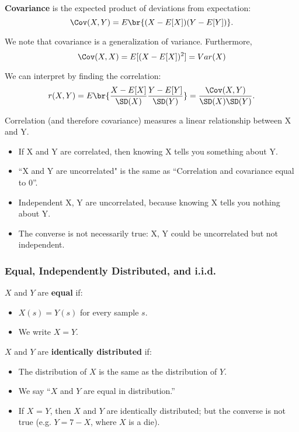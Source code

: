 \documentclass[openany]{book}
\begin{document}
\begin{defn}[Covariance]
	\textbf{Covariance} is the expected product of deviations from expectation:
	\begin{equation*}
		\Cov(X,Y) = E\br{(X- E[X]) (Y-E[Y])}.
	\end{equation*}
\end{defn}

\begin{rmk}
	We note that covariance is a generalization of variance. Furthermore, 
	\begin{equation*}
		\Cov(X,X) = E[(X - E[X])^{2}] = Var(X)
	\end{equation*}
\end{rmk}

We can interpret by finding the correlation:
\begin{equation*}
	r(X,Y) = E \br{\dfrac{X - E[X]}{\SD(X)} \dfrac{Y-E[Y]}{\SD(Y)}} = \dfrac{\Cov(X,Y)}{\SD(X)\SD(Y)}. 
\end{equation*}

Correlation (and therefore covariance) measures a linear relationship between X and Y.
\begin{itemize}
	\item If X and Y are correlated, then knowing X tells you something about Y.
	\item ``X and Y are uncorrelated" is the same as “Correlation and covariance equal to 0”.
	\item Independent X, Y are uncorrelated, because knowing X tells you nothing about Y.
	\item The converse is not necessarily true: X, Y could be uncorrelated but not independent.
\end{itemize}

\subsubsection{Equal, Independently Distributed, and i.i.d.}
\begin{defn}[Equal]
	$X$ and $Y$ are \textbf{equal} if:
	\begin{itemize}
		\item $X(s) = Y(s)$ for every sample $s$.
		\item We write $X = Y$.
	\end{itemize}
\end{defn}

\begin{defn}
	$X$ and $Y$ are \textbf{identically distributed} if:
	\begin{itemize}
		\item The distribution of $X$ is the same as the distribution of $Y$.
		\item We say “$X$ and $Y$ are equal in distribution.”
		\item If $X$ = $Y$, then $X$ and $Y$ are identically distributed; but the converse is not true (e.g. $Y = 7-X$, where $X$ is a die).
	\end{itemize}
\end{defn}
\end{document}
